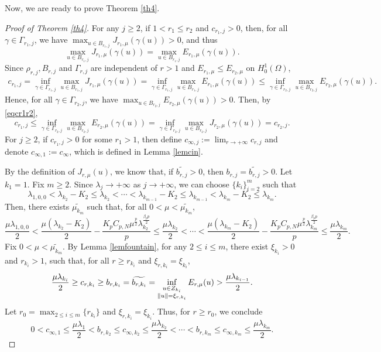 \documentclass[11pt]{amsart}
\newcommand{\norm}[1]{\lVert#1\rVert}
\numberwithin{equation}{section}
\begin{document}
Now, we are ready to prove Theorem \ref{th4}.
\begin{proof}[Proof of Theorem \ref{th4}]
For any $j \geq 2$, if $1<r_{1} \leq r_{2}$ and $c_{r_{1},j}>0$, then, for all $\gamma \in \Gamma_{r_1,j}$, we have $\displaystyle\max_{u \in B_{r_1,j}} J_{r_1,\mu}(\gamma(u))>0$, and thus $$\max_{u \in B_{r_1,j}} J_{r_1, \mu}(\gamma(u))=\max_{u \in B_{r_1,j}} E_{r_1, \mu}(\gamma(u)).$$ Since $\rho_{r,j}, B_{r,j}$ and $\Gamma_{r,j}$  are independent of $r>1$ and $E_{r_1, \mu} \leq E_{r_2, \mu}$ on $H^1_0(\Omega)$,
     \begin{equation}\label{eqcr1r2}
    \begin{aligned}
    c_{r_{1},j}= \inf_{\gamma \in \Gamma_{r_1,j}} \max_{u \in B_{r_1,j}} J_{r_1,\mu}(\gamma(u))= \inf_{\gamma \in \Gamma_{r_1,j}} \max_{u \in B_{r_1,j}} E_{r_1, \mu}(\gamma(u))\leq\inf_{\gamma \in \Gamma_{r_2,j}} \max_{u \in B_{r_2,j}} E_{r_2, \mu}(\gamma(u)).
     \end{aligned}
     \end{equation}
     Hence, for all $\gamma \in \Gamma_{r_2,j}$, we have $\displaystyle\max_{u \in B_{r_2,j}} E_{r_2,\mu}(\gamma(u))>0$. Then, by \eqref{eqcr1r2},
     $$
     c_{r_{1},j}\leq\inf_{\gamma \in \Gamma_{r_2,j}} \max_{u \in B_{r_2,j}} E_{r_2, \mu}(\gamma(u))=\inf_{\gamma \in \Gamma_{r_2,j}} \max_{u \in B_{r_2,j}} J_{r_2,\mu}(\gamma(u))=c_{r_{2},j}.
     $$
     For $j \geq 2$, if $c_{r_{1},j}>0$ for some $r_1 >1$, then define $c_{\infty,j}:=\lim_{r \to +\infty}c_{r,j}$ and denote $c_{\infty,1}:=c_\infty$, which is defined in Lemma \ref{lemcin}.

By the definition of $J_{r,\mu}(u)$, we know that, if $\widetilde{b_{r,j}}>0$, then $b_{r,j}=\widetilde{b_{r,j}}>0$. Let $k_1=1$. Fix $m \geq 2$. Since $\lambda_{j} \to +\infty$ as $j \to +\infty$, we can choose $\{k_i\}_{i=2}^m$ such that
$$\lambda_{1,0,0} < \lambda_{k_2}-K_2 \leq \lambda_{k_2}<\cdots<\lambda_{k_{m-1}}-K_2\leq \lambda_{k_{m-1}} < \lambda_{k_{m}}-K_2\leq \lambda_{k_{m}}.$$ Then, there exists $\widetilde{\mu_{k_m}}$ such that, for all $0<\mu<\widetilde{\mu_{k_m}}$,
$$
\frac{\mu \lambda_{1,0,0}}{2}< \frac{\mu(\lambda_{k_2}-K_2)}{2}-\frac{K_pC_{p,N}\mu^\frac{p}{2}\lambda_{k_2}^\frac{\beta_pp}{2}}{p} \leq \frac{\mu\lambda_{k_2}}{2}<\cdots <\frac{\mu(\lambda_{k_{m}}-K_2)}{2}-\frac{K_pC_{p,N}\mu^\frac{p}{2}\lambda_{k_{m}}^\frac{\beta_pp}{2}}{p} \leq \frac{\mu\lambda_{k_{m}}}{2}.
$$
Fix $0<\mu<\widetilde{\mu_{k_m}}$. By Lemma \ref{lemfountain}, for any $2 \leq i \leq m$, there exist $\xi_{k_i}>0$ and $r_{k_i}>1$, such that, for all $r\geq r_{k_i}$ and $\xi_{r,k_i}=\xi_{k_i}$,
$$
\frac{\mu\lambda_{k_{i}}}{2}\geq c_{r,k_i}\geq b_{r,k_i}=\widetilde{b_{r,k_i}}=\inf_{\begin{subarray}{c} u \in Z_{k_i} \\ \norm{u}= \xi_{r,k_i}\end{subarray}} E_{r,\mu}(u)  > \frac{\mu\lambda_{k_{i-1}}}{2}.
$$
Let $\displaystyle r_0 = \max_{2\leq i\leq m}\{r_{k_i}\}$ and $\xi_{r,k_i}=\xi_{k_i}$. Thus, for $r \geq r_0$, we conclude
$$
    0 < c_{\infty,1} \leq \frac{\mu\lambda_{1}}{2} < b_{r,k_2} \leq c_{\infty,k_2} \leq \frac{\mu\lambda_{k_2}}{2} <\cdots <
    b_{r,k_m}\leq c_{\infty,k_m} \leq \frac{\mu\lambda_{k_m}}{2}.
$$



\end{proof}
\end{document}
